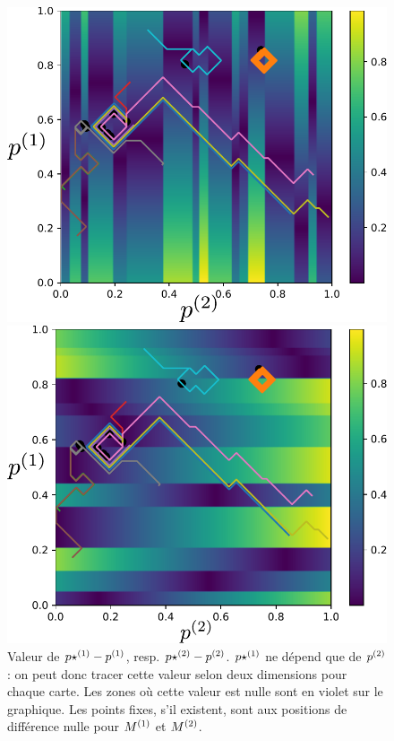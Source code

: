 \begin{figure}
\begin{minipage}{0.5\textwidth}
\centering
\includegraphics[width=\textwidth]{champ_X_006_t1.pdf}
\end{minipage}
\begin{minipage}{0.5\textwidth}
\centering
\includegraphics[width=\textwidth]{champ_Y_006_t1.pdf}
\end{minipage}
\caption{Valeur de ${p\star}^{({1})} - p^{({1})}$, resp. ${p\star}^{({2})} - p^{({2})}$. ${p\star}^{({1})}$ ne dépend que de $p^{({2})}$ : on peut donc tracer cette valeur selon deux dimensions pour chaque carte. Les zones où cette valeur est nulle sont en violet sur le graphique. Les points fixes, s'il existent, sont aux positions de différence nulle pour $M^{({1})}$ et $M^{({2})}$.}
\label{fig:diff_relax_t1}
\end{figure}

